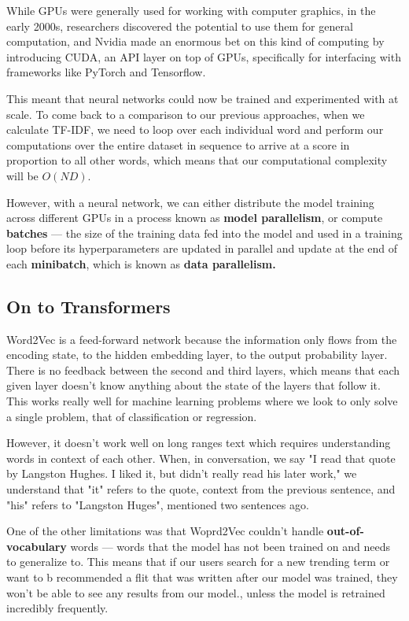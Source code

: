 \documentclass[11pt, table]{diazessay} %
\begin{document}
\begin{sloppypar}
While GPUs were generally used for working with computer graphics, in the early 2000s\citep{oancea2014gpgpu}, researchers discovered the potential to use them for general computation, and Nvidia made an enormous bet on this kind of computing by introducing CUDA, an API layer on top of GPUs, specifically for interfacing with frameworks like PyTorch and Tensorflow.

This meant that neural networks could now be trained and experimented with at scale. To come back to a comparison to our previous approaches, when we calculate TF-IDF, we need to loop over each individual word and perform our computations over the entire dataset in sequence to arrive at a score in proportion to all other words, which means that our computational complexity will be $O(N D)$\citep{cong2016novel}.  

However, with a neural network, we can either distribute the model training across different GPUs in a process known as \textbf{model parallelism}, or compute \textbf{batches} --- the size of the training data fed into the model and used in a training loop before its hyperparameters are updated in parallel and update at the end of each \textbf{minibatch}, which is known as \textbf{data parallelism.}\citep{shallue2018measuring}


\subsection{On to Transformers}

Word2Vec is a feed-forward network because the information only flows from the encoding state, to the hidden embedding layer, to the output probability layer. There is no feedback between the second and third layers, which means that each given layer doesn't know anything about the state of the layers that follow it. This works really well for  machine learning problems where we look to only solve a single problem, that of classification or regression. 

However, it doesn't work well on long ranges text which requires understanding words in context of each other. When, in conversation, we say "I read that quote by Langston Hughes. I liked it, but didn't really read his later work," we understand that "it" refers to the quote, context from the previous sentence, and "his" refers to "Langston Huges", mentioned two sentences ago. 

One of the other limitations was that Woprd2Vec couldn't handle \textbf{out-of-vocabulary} words --- words that the model has not been trained on and needs to generalize to. This means that if our users search for a new trending term or want to b recommended a flit that was written after our model was trained, they won't be able to see any results from our model.\citep{di2021considerations}, unless the model is retrained incredibly frequently. 


\end{sloppypar}
\end{document}
